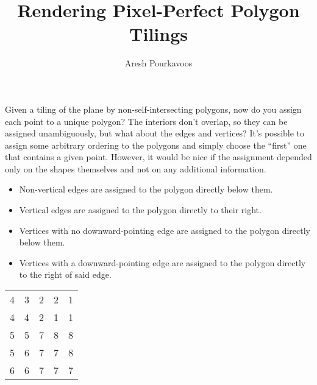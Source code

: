 \documentclass{article}
\begin{document}
\title{Rendering Pixel-Perfect Polygon Tilings}
\author{Aresh Pourkavoos}
\maketitle

Given a tiling of the plane by non-self-intersecting polygons,
now do you assign each point to a unique polygon?
The interiors don't overlap, so they can be assigned unambiguously,
but what about the edges and vertices?
It's possible to assign some arbitrary ordering to the polygons
and simply choose the ``first'' one that contains a given point.
However, it would be nice if the assignment
depended only on the shapes themselves
and not on any additional information.
\begin{itemize}
\item
  Non-vertical edges are assigned to the polygon directly below them.
\item
  Vertical edges are assigned to the polygon directly to their right.
\item
  Vertices with no downward-pointing edge are assigned to the polygon directly below them.
\item
  Vertices with a downward-pointing edge are assigned to the polygon directly to the right of said edge.
\end{itemize}
\begin{center}
  \begin{tabular}{|c c c c c|}
    \hline
    4 & 3 & 2 & 2 & 1 \\
    4 & 4 & 2 & 1 & 1 \\
    5 & 5 & 7 & 8 & 8 \\
    5 & 6 & 7 & 7 & 8 \\
    6 & 6 & 7 & 7 & 7 \\ \hline
  \end{tabular}
\end{center}
\end{document}
